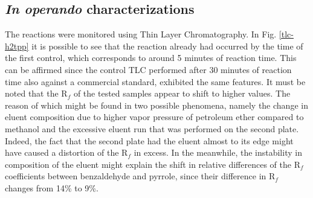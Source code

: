 \documentclass[twoside,twocolumn,9pt]{article}
\begin{document}
\subsection{\textit{In operando} characterizations}
The reactions were monitored using Thin Layer Chromatography.
In Fig. \ref{tlc-h2tpp} it is possible to see that the reaction already had occurred by the time of the first control, which corresponds to around 5 minutes of reaction time.
This can be affirmed since the control TLC performed after 30 minutes of reaction time also against a commercial standard, exhibited the same features.
It must be noted that the R$_{f}$ of the tested samples appear to shift to higher values.
The reason of which might be found in two possible phenomena, namely the change in eluent composition due to higher vapor pressure of petroleum ether compared to methanol and the excessive eluent run that was performed on the second plate.
Indeed, the fact that the second plate had the eluent almost to its edge might have caused a distortion of the R$_{f}$ in excess.
In the meanwhile, the instability in composition of the eluent might explain the shift in relative differences of the R$_{f}$ coefficients between benzaldehyde and pyrrole, since their difference in R$_{f}$ changes from 14\% to 9\%.
\end{document}

